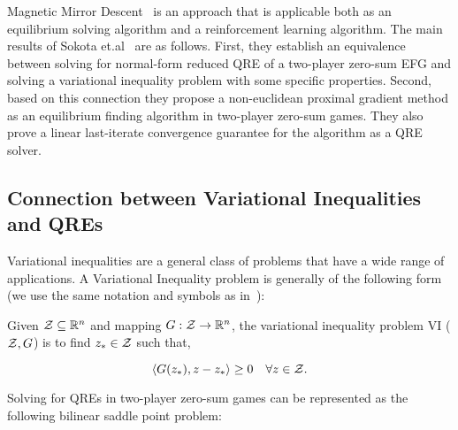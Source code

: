 Magnetic Mirror Descent~\cite{sokotaUnified2023} is an approach that is applicable both as an
equilibrium solving algorithm and a reinforcement learning algorithm.
The main results of Sokota et.al~\cite{sokotaUnified2023} are as follows.
First, they establish an equivalence between solving for normal-form reduced QRE of a two-player
zero-sum EFG and solving a variational inequality problem with some specific properties.
Second, based on this connection they propose a non-euclidean proximal gradient method as an
equilibrium finding algorithm in two-player zero-sum games.
They also prove a linear last-iterate convergence guarantee for the algorithm as a QRE solver.


\subsection{Connection between Variational Inequalities and QREs}

Variational inequalities are a general class of problems that have a wide range of applications.
A Variational Inequality problem is generally of the following form (we use the same notation and
symbols as in~\cite{sokotaUnified2023}):

\begin{definition}
	Given $\mathcal{Z}
		\subseteq \mathbb{R}^n$ and mapping $G: \mathcal{Z} \rightarrow \mathbb{R}^n$, the variational inequality problem VI
	($\mathcal{Z}, G$) is to find $z_{\ast} \in \mathcal{Z}$ such that,

	\[ \langle G(z_{\ast}),
		z - z_{\ast} \rangle \geq 0 \quad \forall z \in \mathcal{Z}.
	\]
\end{definition}


Solving for QREs in two-player zero-sum games can be represented as the following bilinear saddle
point problem:

